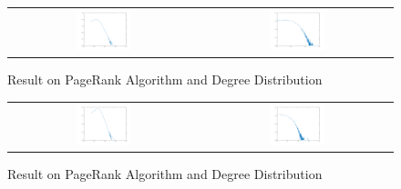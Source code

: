 \begin{figure}[H]
\begin{center}
\begin{tabular}{cc}
     \includegraphics[width=0.3\textwidth]{FIG/3pagerank.png} &
     \includegraphics[width=0.3\textwidth]{FIG/3degreedist.png} \\
\end{tabular}
\caption{Result on PageRank Algorithm and Degree Distribution}
\end{center}
\end{figure}

\begin{figure}[H]
\begin{center}
\begin{tabular}{cc}
     \includegraphics[width=0.3\textwidth]{FIG/4pagerank.png} &
     \includegraphics[width=0.3\textwidth]{FIG/4degreedist.png} \\
\end{tabular}
\caption{Result on PageRank Algorithm and Degree Distribution}
\end{center}
\end{figure}

